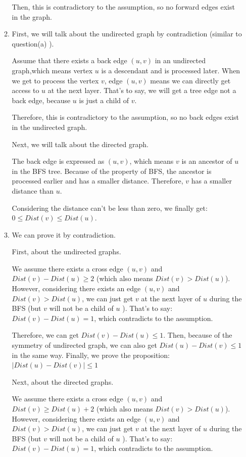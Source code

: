 \documentclass[12pt,a4paper]{article}
\theoremstyle{definition}
\begin{document}
\begin{enumerate}
\begin{enumerate}
 	Then, this is contradictory to the assumption, so no forward edges exist in the graph.
 	
 	\item First, we will talk about the undirected graph by contradiction (similar to question(a) ).
 	
 	Assume that there exists a back edge $(u,v)$ in an undirected graph,which means vertex $u$ is a descendant and is processed later. When we get to process the vertex $v$, edge $(u,v)$ means we can directly get access to $u$ at the next layer. That's to say, we will get a tree edge not a back edge, because $u$ is just a child of $v$.
 	
 	Therefore,  this is contradictory to the assumption, so no back edges exist in the undirected graph.
 	
 	Next, we will talk about the directed graph.
 	
 	The back edge is expressed as $(u,v)$, which means $v$ is an ancestor of $u$ in the BFS tree. Because of the property of BFS, the ancestor is processed earlier and has a smaller distance. Therefore, $v$ has a smaller distance than $u$. 
 	
 	Considering the distance can't be less than zero, we finally get:   $0\leq Dist(v)\leq Dist(u)$.
 	
 	\item We can prove it by contradiction.
 	
 	First, about the undirected graphs. 
 	
 	We assume there exists a cross edge $(u,v)$ and $Dist(v)-Dist(u) \geq 2$ (which also means $Dist(v)>Dist(u)$). However, considering there exists an edge $(u,v)$ and $Dist(v)>Dist(u)$,  we can just get $v$ at the next layer of $u$ during the BFS (but $v$ will not be a child of $u$ ). That's to say:  $Dist(v)-Dist(u)=1$, which contradicts to the assumption. 
 	
 	Therefore, we can get $Dist(v)-Dist(u) \leq 1$. Then, because of the symmetry of undirected graph, we can also get  $Dist(u)-Dist(v) \leq 1$ in the same way. Finally, we prove the proposition: $|Dist(u)-Dist(v)| \leq 1$
 	
 	Next, about the directed graphs.
 	
 	We assume there exists a cross edge $(u,v)$ and $Dist(v)\geq Dist(u)+2$ (which also means $Dist(v)>Dist(u)$). However, considering there exists an edge $(u,v)$ and $Dist(v)>Dist(u)$,  we can just get $v$ at the next layer of $u$ during the BFS (but $v$ will not be a child of $u$ ). That's to say: $Dist(v)-Dist(u)=1$, which contradicts to the assumption. 
 	

\end{enumerate}
\end{enumerate}
\end{document}
